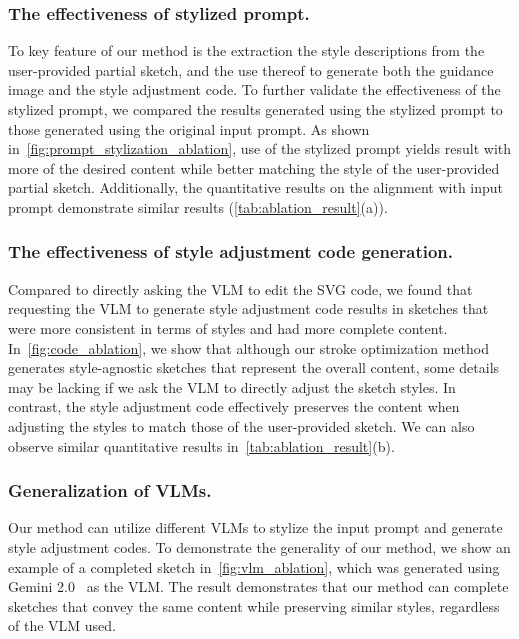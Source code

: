 \subsubsection{The effectiveness of stylized prompt.}

To key feature of our method is the extraction the style descriptions from the user-provided partial sketch, and the use thereof to generate both the guidance image and the style adjustment code.
To further validate the effectiveness of the stylized prompt, we compared the results generated using the stylized prompt to those generated using the original input prompt.
As shown in~\cref{fig:prompt_stylization_ablation}, use of the stylized prompt yields result with more of the desired content while better matching the style of the user-provided partial sketch.
Additionally, the quantitative results on the alignment with input prompt demonstrate similar results (\cref{tab:ablation_result}(a)). 




\subsubsection{The effectiveness of style adjustment code generation.}
Compared to directly asking the VLM to edit the SVG code, we found that requesting the VLM to generate style adjustment code results in sketches that were more consistent in terms of styles and had more complete content.
In~\cref{fig:code_ablation}, we show that although our stroke optimization method generates style-agnostic sketches that represent the overall content, some details may be lacking if we ask the VLM to directly adjust the sketch styles.
In contrast, the style adjustment code effectively preserves the content when adjusting the styles to match those of the user-provided sketch.
We can also observe similar quantitative results in~\cref{tab:ablation_result}(b).


\subsubsection{Generalization of VLMs.}

Our method can utilize different VLMs to stylize the input prompt and generate style adjustment codes.
To demonstrate the generality of our method, we show an example of a completed sketch in~\cref{fig:vlm_ablation}, which was generated using Gemini 2.0~\cite{team2023gemini} as the VLM.
The result demonstrates that our method can complete sketches that convey the same content while preserving similar styles, regardless of the VLM used.






